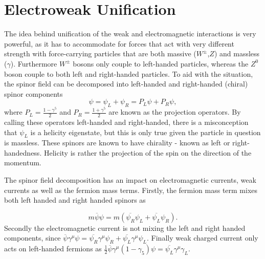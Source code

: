 \section{Electroweak Unification}
\label{weak}
The idea behind unification of the weak and electromagnetic interactions is very powerful, as it has to accommodate for forces that act with very different strength with force-carrying particles that are both massive ($W^{\pm}$,$Z$) and massless ($\gamma$). Furthermore $W^{\pm}$ bosons only couple to left-handed particles, whereas the $Z^{0}$ boson couple to both left and right-handed particles. 
To aid with the situation, the spinor field can be decomposed into left-handed and right-handed (chiral) spinor components
\begin{equation}
	\psi=\psi_{L}+\psi_{R} = P_{L}\psi + P_{R}\psi,
\end{equation}
where $P_{L} =\frac{1-\gamma^{5}}{2}$ and $P_{R}=\frac{1+\gamma^{5}}{2}$ are known as the projection operators. By calling these operators left-handed and right-handed, there is a misconception that $\psi_{L}$ is a helicity eigenstate, but this is only true given the particle in question is massless. These spinors are known to have chirality - known as left or right-handedness. Helicity is rather the projection of the spin on the direction of the momentum.

The spinor field decomposition has an impact on electromagnetic currents, weak currents as well as the fermion mass terms. Firstly, the fermion mass term mixes both left handed and right handed spinors as 

\begin{equation}
	m\overline{\psi}\psi=m(\overline{\psi_{R}}\psi_{L} + \overline{\psi_{L}}\psi_{R}).
\label{eq:mixingpsi}
\end{equation}	
Secondly the electromagnetic current is not mixing the left and right handed components, since $\overline{\psi}\gamma^{\mu}\psi=\overline{\psi_{R}}\gamma^{\mu}\psi_{R} + \overline{\psi_{L}}\gamma^{\mu}\psi_{L}$. Finally weak charged current only acts on left-handed fermions as $\frac{1}{2}\overline{\psi}\gamma^{\mu}(1-\gamma_{5})\psi = \overline{\psi_{L}}\gamma^{\mu}\gamma_{L}$.   


